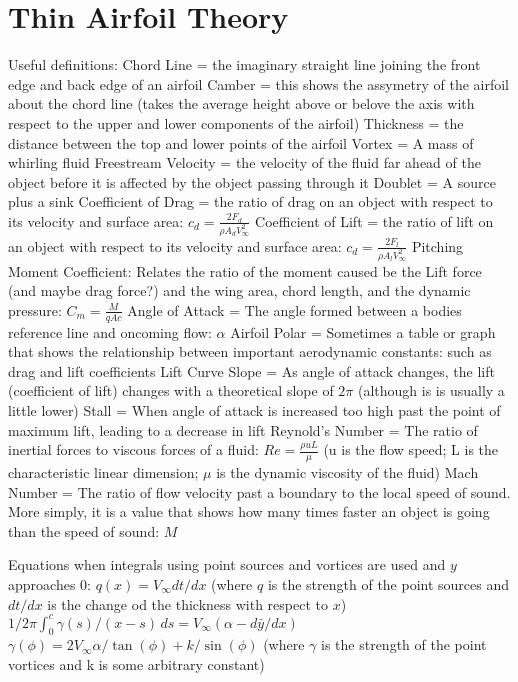 \documentclass[12pt, letterpaper]{article}
\begin{document}
\section{Thin Airfoil Theory}
Useful definitions:
Chord Line = the imaginary straight line joining the front edge and back edge of an airfoil
Camber = this shows the assymetry of the airfoil about the chord line (takes the average height above or belove the axis with respect to the upper
         and lower components of the airfoil)
Thickness = the distance between the top and lower points of the airfoil
Vortex = A mass of whirling fluid
Freestream Velocity = the velocity of the fluid far ahead of the object before it is affected by the object passing through it
Doublet = A source plus a sink
Coefficient of Drag = the ratio of drag on an object with respect to its velocity and surface area: $c_d = \frac{2F_d}{\rho A_d V_\infty^2}$
Coefficient of Lift = the ratio of lift on an object with respect to its velocity and surface area: $c_d = \frac{2F_l}{\rho A_l V_\infty^2}$
Pitching Moment Coefficient: Relates the ratio of the moment caused be the Lift force (and maybe drag force?) and the wing area, chord length, and 
                             the dynamic pressure: $C_m = \frac{M}{qAc}$
Angle of Attack = The angle formed between a bodies reference line and oncoming flow: $\alpha$
Airfoil Polar = Sometimes a table or graph that shows the relationship between important aerodynamic constants: such as drag and lift coefficients
Lift Curve Slope = As angle of attack changes, the lift (coefficient of lift) changes with a theoretical slope of $2\pi$ (although is is usually a little lower)
Stall = When angle of attack is increased too high past the point of maximum lift, leading to a decrease in lift
Reynold's Number = The ratio of inertial forces to viscous forces of a fluid: $Re = \frac{\rho u L}{\mu}$ (u is the flow speed; L is the characteristic linear dimension;
                    $\mu$ is the dynamic viscosity of the fluid)
Mach Number = The ratio of flow velocity past a boundary to the local speed of sound. More simply, it is a value that shows how many times faster an object is going than the speed of sound: $M$

Equations when integrals using point sources and vortices are used and $y$ approaches $0$:
$q(x)=V_\infty dt/dx$ (where $q$ is the strength of the point sources and $dt/dx$ is the change od the thickness with respect to $x$)
$1/2\pi \int_{0}^{c} \gamma(s)/(x-s) \,ds = V_\infty (\alpha - d\bar{y}/dx)$
$\gamma(\phi) = 2V_\infty\alpha/\tan(\phi) + k/\sin(\phi)$ (where $\gamma$ is the strength of the point vortices and k is some arbitrary constant)
\end{document}
